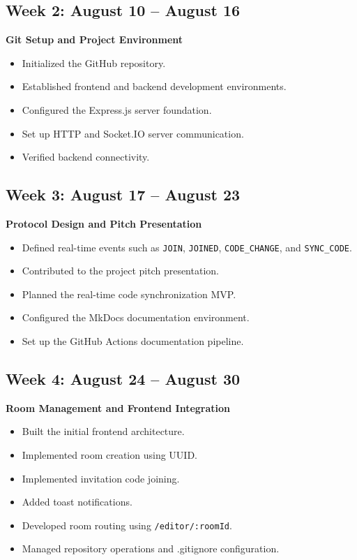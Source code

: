 \documentclass[12pt,a4paper,oneside]{report}
\begin{document}
\subsection*{Week 2: August 10 -- August 16}

\textbf{Git Setup and Project Environment}

\begin{itemize}
    \item Initialized the GitHub repository.
    \item Established frontend and backend development environments.
    \item Configured the Express.js server foundation.
    \item Set up HTTP and Socket.IO server communication.
    \item Verified backend connectivity.
\end{itemize}

\subsection*{Week 3: August 17 -- August 23}

\textbf{Protocol Design and Pitch Presentation}

\begin{itemize}
    \item Defined real-time events such as \texttt{JOIN},
    \texttt{JOINED}, \texttt{CODE\_CHANGE}, and
    \texttt{SYNC\_CODE}.
    \item Contributed to the project pitch presentation.
    \item Planned the real-time code synchronization MVP.
    \item Configured the MkDocs documentation environment.
    \item Set up the GitHub Actions documentation pipeline.
\end{itemize}

\subsection*{Week 4: August 24 -- August 30}

\textbf{Room Management and Frontend Integration}

\begin{itemize}
    \item Built the initial frontend architecture.
    \item Implemented room creation using UUID.
    \item Implemented invitation code joining.
    \item Added toast notifications.
    \item Developed room routing using \texttt{/editor/:roomId}.
    \item Managed repository operations and .gitignore configuration.
\end{itemize}
\end{document}
